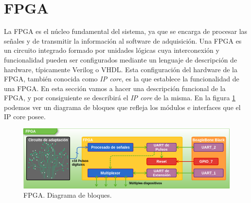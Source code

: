 \section{FPGA}
	La FPGA es el núcleo fundamental del sistema, ya que se encarga de procesar las señales y de transmitir la información al software de
	adquisición. Una FPGA es un circuito integrado formado por unidades lógicas cuya interconexión y funcionalidad pueden ser configurados
	mediante un lenguaje de descripción de hardware, típicamente Verilog o VHDL. Esta configuración del hardware de la FPGA, también conocida como
	\emph{IP core}, es la que establece la funcionalidad de una FPGA. En esta sección vamos a hacer una descripción funcional de la FPGA, y por
	consiguiente se describirá el \emph{IP core} de la misma. En la figura \ref{fig:fpga} podemos ver un diagrama de bloques que refleja los
	módulos e interfaces que el IP core posee.
	\begin{figure}[h]
		\centering
		\includegraphics[keepaspectratio, width=1\textwidth]{./img/fpga.png}
		\caption{FPGA. Diagrama de bloques.}
		\label{fig:fpga}
	\end{figure}	
